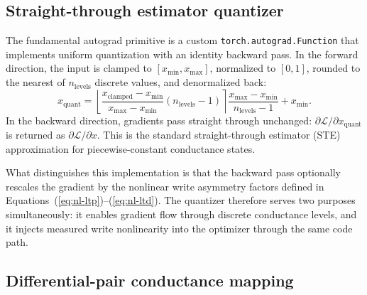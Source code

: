 \subsection{Straight-through estimator quantizer}

The fundamental autograd primitive is a custom \texttt{torch.autograd.Function} that implements uniform quantization with an identity backward pass. In the forward direction, the input is clamped to $[x_{\min}, x_{\max}]$, normalized to $[0,1]$, rounded to the nearest of $n_{\text{levels}}$ discrete values, and denormalized back:
\begin{equation}
x_{\text{quant}} = \left\lfloor \frac{x_{\text{clamped}} - x_{\min}}{x_{\max} - x_{\min}} (n_{\text{levels}} - 1) \right\rceil \frac{x_{\max} - x_{\min}}{n_{\text{levels}} - 1} + x_{\min}.
\label{eq:ste-forward}
\end{equation}
In the backward direction, gradients pass straight through unchanged: $\partial \mathcal{L} / \partial x_{\text{quant}}$ is returned as $\partial \mathcal{L} / \partial x$. This is the standard straight-through estimator (STE) approximation for piecewise-constant conductance states.

What distinguishes this implementation is that the backward pass optionally rescales the gradient by the nonlinear write asymmetry factors defined in Equations~(\ref{eq:nl-ltp})--(\ref{eq:nl-ltd}). The quantizer therefore serves two purposes simultaneously: it enables gradient flow through discrete conductance levels, and it injects measured write nonlinearity into the optimizer through the same code path.

\subsection{Differential-pair conductance mapping}


